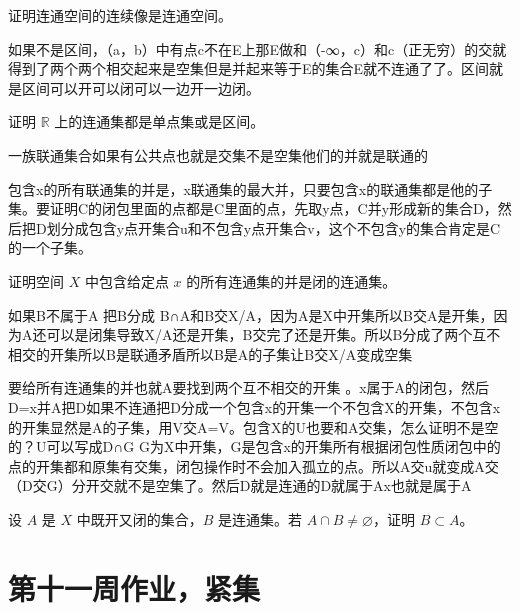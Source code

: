 \begin{homework}[2]
证明连通空间的连续像是连通空间。
\end{homework}
\begin{dxtips}
    如果不是区间，（a，b）中有点c不在E上那E做和（-∞，c）和c（正无穷）的交就得到了两个两个相交起来是空集但是并起来等于E的集合E就不连通了了。区间就是区间可以开可以闭可以一边开一边闭。
\end{dxtips}
\begin{homework}[3]
证明 $\mathbb{R}$ 上的连通集都是单点集或是区间。
\end{homework}
\begin{dxtips}
   一族联通集合如果有公共点也就是交集不是空集他们的并就是联通的 
\end{dxtips}
\begin{dxtips}
    包含x的所有联通集的并是，x联通集的最大并，只要包含x的联通集都是他的子集。要证明C的闭包里面的点都是C里面的点，先取y点，C并{y}形成新的集合D，然后把D划分成包含y点开集合u和不包含y点开集合v，这个不包含y的集合肯定是C的一个子集。
\end{dxtips}
\begin{homework}[4.1]
证明空间 $X$ 中包含给定点 $x$ 的所有连通集的并是闭的连通集。
\end{homework}
\begin{dxtips}
    如果B不属于A
    把B分成 B∩A和B交{X/A}，因为A是X中开集所以B交A是开集，因为A还可以是闭集导致X/A还是开集，B交完了还是开集。所以B分成了两个互不相交的开集所以B是联通矛盾所以B是A的子集让B交{X/A}变成空集
\end{dxtips}
\begin{dxtips}
    要给所有连通集的并也就A要找到两个互不相交的开集
    。x属于A的闭包，然后D=x并A把D如果不连通把D分成一个包含x的开集一个不包含X的开集，不包含x的开集显然是A的子集，用V交A=V。包含X的U也要和A交集，怎么证明不是空的？U可以写成D∩G G为X中开集，G是包含x的开集所有根据闭包性质闭包中的点的开集都和原集有交集，闭包操作时不会加入孤立的点。所以A交u就变成A交（D交G）分开交就不是空集了。然后D就是连通的D就属于Ax也就是属于A
\end{dxtips}
\begin{homework}[4.4]
设 $A$ 是 $X$ 中既开又闭的集合，$B$ 是连通集。若 $A\cap B\neq\varnothing$，证明 $B\subset A$。
\end{homework}

\section{第十一周作业，紧集}

